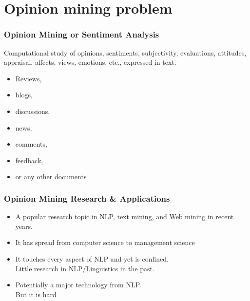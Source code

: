 \documentclass[t]{beamer}
\begin{document}
\section{Opinion mining problem}

\begin{frame} \frametitle{Opinion Mining or Sentiment Analysis} %

\begin{block}{}

Computational study of opinions, sentiments, subjectivity, evaluations, attitudes, appraisal, affects, views, emotions, etc., expressed in text.

\begin{itemize}
\item Reviews, 
\item blogs, 
\item discussions, 
\item news, 
\item comments, 
\item feedback, 
\item or any other documents
\end{itemize}

\end{block}

\end{frame} 




\begin{frame} \frametitle{Opinion Mining Research \& Applications} %

\begin{itemize}

\item A popular research topic in NLP, text mining, and Web mining in recent
years.


\item It has spread from computer science to management science 


\item It touches every aspect of NLP and yet is confined. \\Little research in NLP/Linguistics in the past. 

\item Potentially a major technology from NLP. \\But it is hard

\end{itemize}
\end{frame} 
\end{document}
